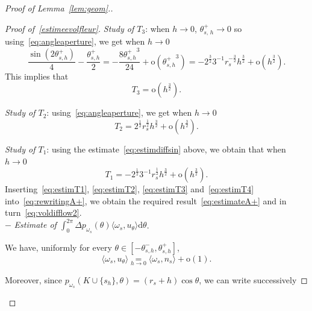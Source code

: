 \documentclass[10pt]{amsart}
\theoremstyle{definition}\newtheorem{defi}[theo]{Definition}\newtheorem{rema}[theo]{Remark}\newtheorem{exam}[theo]{Example}\newtheorem{exem}[theo]{Example}\newtheorem{nota}[theo]{Notation}
\newcommand{\dd}{\mathrm{d}}
\newcommand{\od}{\mathrm{o}}
\newcommand{\pass}{\vspace{0.3cm}\noindent}
\newcommand{\noi}{\noindent}
\newenvironment*{prooff}{\begin{proof}}{\let\qed\relax\end{proof}}
\begin{document}
\begin{proof}[{Proof of Lemma~\ref{lem:geom}.}]
\begin{prooff}[{Proof of~\eqref{estimeevolfleur}}]
\noindent\emph{Study of $T_3$}: when $h\to 0$, $\theta_{s,\,h}^+\to 0$ so using~\eqref{eq:angleaperture}, we get when $h\to 0$
\begin{equation}\label{eq:estimdiffsin}
\frac{\sin (2\theta_{s,h}^+)}{4}-\frac{\theta_{s,h}^+}{2}= -\frac{8 {\theta_{s,h}^+}^3}{24}+\od\left({\theta_{s,h}^+}^3\right) = -2^{\frac32}3^{-1}r_s^{-\frac32}h^{\frac32}+\od\left(h^{\frac32}\right).
\end{equation}
This implies that
\begin{equation}\label{eq:estimT3}
T_3=\od\left(h^{\frac32}\right).
\end{equation}


\noindent\emph{Study of $T_2$}: using~\eqref{eq:angleaperture}, we get when $h\to 0$
\begin{equation}\label{eq:estimT2}
T_2=2^{\frac12}r_s^{\frac12}h^{\frac32}+\od\left(h^{\frac32}\right).
\end{equation}


\noindent\emph{Study of $T_1$}: using the estimate~\eqref{eq:estimdiffsin} above, we obtain that when $h\to 0$
\begin{equation}\label{eq:estimT1}
T_1=-2^{\frac12}3^{-1}r_s^{\frac12}h^{\frac32}+\od\left(h^{\frac32}\right).
\end{equation}
Inserting~\eqref{eq:estimT1}, \eqref{eq:estimT2}, \eqref{eq:estimT3} and~\eqref{eq:estimT4} into~\eqref{eq:rewritingA+}, we obtain the required result~\eqref{eq:estimateA+} and in turn~\eqref{eq:voldifflow2}.\\

$-$ \emph{Estimate of $\int_0^{2\pi} \Delta p_{\omega_s}(\theta)\langle \omega_s, u_{\theta}\rangle\dd\theta$}.

We have, uniformly for every $\theta\in[-\theta_{s,h}^-,\theta_{s,h}^+]$,
\[
\langle \omega_s, u_{\theta}\rangle \underset{h\to 0}{=} \langle \omega_s, n_s\rangle + \od(1).
\]

Moreover, since $p_{\omega_s}(K\cup\{s_h\},\theta)= (r_s+h)\cos\theta$, we can write successively


\end{prooff}
\end{proof}
\end{document}
